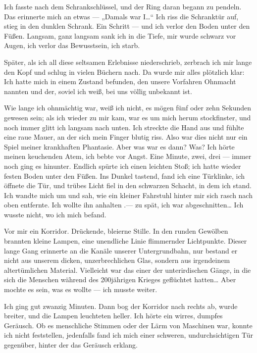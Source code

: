 Ich fasste nach dem Schrankschlüssel, und der Ring daran begann zu
pendeln. Das erinnerte mich an etwas — „Damals war I\ldots{}“ Ich riss
die Schranktür auf, stieg in den dunklen Schrank. Ein Schritt — und
ich verlor den Boden unter den Füßen. Langsam, ganz langsam sank
ich in die Tiefe, mir wurde schwarz vor Augen, ich verlor das
Bewusstsein, ich starb.

Später, als ich all diese seltsamen Erlebnisse niederschrieb,
zerbrach ich mir lange den Kopf und schlug in vielen Büchern nach.
Da wurde mir alles plötzlich klar: Ich hatte mich in einem Zustand
befunden, den unsere Vorfahren Ohnmacht nannten und der, soviel ich
weiß, bei uns völlig unbekannt ist.

Wie lange ich ohnmächtig war, weiß ich nicht, es mögen fünf oder
zehn Sekunden gewesen sein; als ich wieder zu mir kam, war es um
mich herum stockfinster, und noch immer glitt ich langsam nach
unten. Ich streckte die Hand aus und fühlte eine raue Mauer, an der
sich mein Finger blutig riss. Also war dies nicht nur ein Spiel
meiner krankhaften Phantasie. Aber was war es dann? Was? Ich hörte
meinen keuchenden Atem, ich bebte vor Angst. Eine Minute, zwei,
drei — immer noch ging es hinunter. Endlich spürte ich einen
leichten Stoß; ich hatte wieder festen Boden unter den Füßen. Ins
Dunkel tastend, fand ich eine Türklinke, ich öffnete die Tür, und
trübes Licht fiel in den schwarzen Schacht, in dem ich stand. Ich
wandte mich um und sah, wie ein kleiner Fahrstuhl hinter mir sich
rasch nach oben entfernte. Ich wollte ihn anhalten .— zu spät, ich
war abgeschnitten\ldots{} Ich wusste nicht, wo ich mich befand.

Vor mir ein Korridor. Drückende, bleierne Stille. In den runden
Gewölben brannten kleine Lampen, eine unendliche Linie flimmernder
Lichtpunkte. Dieser lange Gang erinnerte an die Kanäle unserer
Untergrundbahn, nur bestand er nicht aus unserem dicken,
unzerbrechlichen Glas, sondern aus irgendeinem altertümlichen
Material. Vielleicht war das einer der unterirdischen Gänge, in die
sich die Menschen während des 200jährigen Krieges geflüchtet
hatten\ldots{} Aber mochte es sein, was es wollte — ich musste weiter.

Ich ging gut zwanzig Minuten. Dann bog der Korridor nach rechts ab,
wurde breiter, und die Lampen leuchteten heller. Ich hörte ein
wirres, dumpfes Geräusch. Ob es menschliche Stimmen oder der Lärm
von Maschinen war, konnte ich nicht feststellen, jedenfalls fand
ich mich einer schweren, undurchsichtigen Tür gegenüber, hinter der
das Geräusch erklang.

